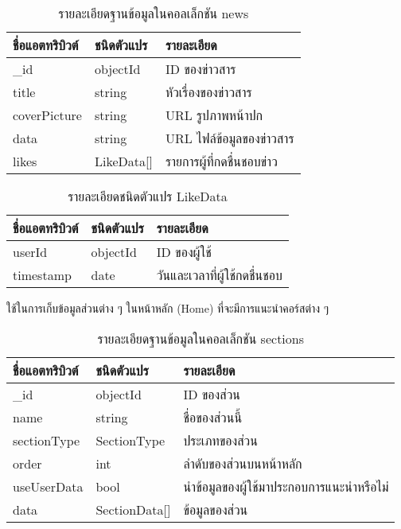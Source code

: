 \begin{table}
    \caption{รายละเอียดฐานข้อมูลในคอลเล็กชัน news}
    \begin{tabularx}{\textwidth}{ | l | l | X | }
        \hline
        \bf ชื่อแอตทริบิวต์ & \bf ชนิดตัวแปร & \bf รายละเอียด \\\hline
        \_id & objectId & ID ของข่าวสาร\\\hline
        title & string & หัวเรื่องของข่าวสาร\\\hline
        coverPicture & string & URL รูปภาพหน้าปก\\\hline
        data & string & URL ไฟล์ข้อมูลของข่าวสาร\\\hline
        likes & LikeData[] & รายการผู้ที่กดชื่นชอบข่าว\\\hline
    \end{tabularx}
\end{table}

\begin{table}
    \caption{รายละเอียดชนิดตัวแปร LikeData}
    \begin{tabularx}{\textwidth}{ | l | l | X | }
        \hline
        \bf ชื่อแอตทริบิวต์ & \bf ชนิดตัวแปร & \bf รายละเอียด \\\hline
        userId & objectId & ID ของผู้ใช้\\\hline
        timestamp & date & วันและเวลาที่ผู้ใช้กดชื่นชอบ\\\hline
    \end{tabularx}
\end{table}

\begin{table}
    \caption{รายละเอียดฐานข้อมูลในคอลเล็กชัน sections}
    \noindent ใช้ในการเก็บข้อมูลส่วนต่าง ๆ ในหน้าหลัก (Home) ที่จะมีการแนะนำคอร์สต่าง ๆ
    \begin{tabularx}{\textwidth}{ | l | l | X | }
        \hline
        \bf ชื่อแอตทริบิวต์ & \bf ชนิดตัวแปร & \bf รายละเอียด \\\hline
        \_id & objectId & ID ของส่วน\\\hline
        name & string & ชื่อของส่วนนี้\\\hline
        sectionType & SectionType & ประเภทของส่วน\\\hline
        order & int & ลำดับของส่วนบนหน้าหลัก\\\hline
        useUserData & bool & นำข้อมูลของผู้ใช้มาประกอบการแนะนำหรือไม่\\\hline
        data & SectionData[] & ข้อมูลของส่วน\\\hline
    \end{tabularx}
\end{table}

